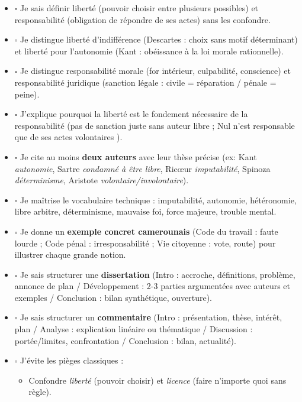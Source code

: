 \documentclass[11pt]{article}
\newcommand{\cle}[1]{{\popxbold\color{popdark}#1}}
\newcounter{popsec}
\newcounter{popsub}
\newcommand{\courssub}[1]{%
  \stepcounter{popsub}%
  \par\vspace{9pt}\noindent{\popxbold\fontsize{11.5}{13}\selectfont\color{popink}{\color{poporange}\thepopsec.\thepopsub}\hspace{6pt}#1}\par\nopagebreak\vspace{4pt}
}
\begin{document}
\courssub{Checklist avant le Bac}
\begin{aretenir}
\begin{itemize}
  \item $\square$ Je sais définir \cle{liberté} (pouvoir choisir entre plusieurs possibles) et \cle{responsabilité} (obligation de répondre de ses actes) sans les confondre.
  \item $\square$ Je distingue \cle{liberté d'indifférence} (Descartes : choix sans motif déterminant) et \cle{liberté pour l'autonomie} (Kant : obéissance à la loi morale rationnelle).
  \item $\square$ Je distingue \cle{responsabilité morale} (for intérieur, culpabilité, conscience) et \cle{responsabilité juridique} (sanction légale : civile = réparation / pénale = peine).
  \item $\square$ J'explique pourquoi la \cle{liberté est le fondement nécessaire} de la responsabilité (pas de sanction juste sans auteur libre ; \og Nul n'est responsable que de ses actes volontaires \fg{}).
  \item $\square$ Je cite au moins \textbf{deux auteurs} avec leur thèse précise (ex: Kant \emph{autonomie}, Sartre \emph{condamné à être libre}, Ricœur \emph{imputabilité}, Spinoza \emph{déterminisme}, Aristote \emph{volontaire/involontaire}).
  \item $\square$ Je maîtrise le vocabulaire technique : \cle{imputabilité}, \cle{autonomie}, \cle{hétéronomie}, \cle{libre arbitre}, \cle{déterminisme}, \cle{mauvaise foi}, \cle{force majeure}, \cle{trouble mental}.
  \item $\square$ Je donne un \textbf{exemple concret camerounais} (Code du travail : faute lourde ; Code pénal : irresponsabilité ; Vie citoyenne : vote, route) pour illustrer chaque grande notion.
  \item $\square$ Je sais structurer une \textbf{dissertation} (Intro : accroche, définitions, problème, annonce de plan / Développement : 2-3 parties argumentées avec auteurs et exemples / Conclusion : bilan synthétique, ouverture).
  \item $\square$ Je sais structurer un \textbf{commentaire} (Intro : présentation, thèse, intérêt, plan / Analyse : explication linéaire ou thématique / Discussion : portée/limites, confrontation / Conclusion : bilan, actualité).
  \item $\square$ J'évite les pièges classiques : 
    \begin{itemize}
      \item Confondre \emph{liberté} (pouvoir choisir) et \emph{licence} (faire n'importe quoi sans règle).

\end{itemize}
\end{itemize}
\end{aretenir}
\end{document}
